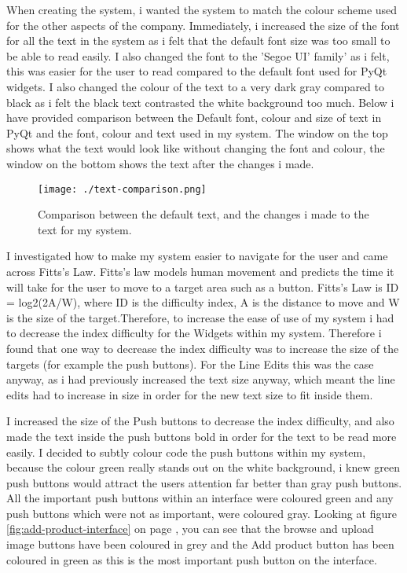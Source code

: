 When creating the system, i wanted the system to match the colour scheme used for the other aspects of the company. Immediately, i increased the size of the font for all the text in the system as i felt that the default font size was too small to be able to read easily. I also changed the font to the 'Segoe UI' family' as i felt, this was easier for the user to read compared to the default font used for PyQt widgets. I also changed the colour of the text to a very dark gray compared to black as i felt the black text contrasted the white background too much. Below i have provided comparison between the Default font, colour and size of text in PyQt and the font, colour and text used in my system. The window on the top shows what the text would look like without changing the font and colour, the window on the bottom shows the text after the changes i made.

\begin{figure}[H]
    \texttt{[image: ./text-comparison.png]}
    \caption{Comparison between the default text, and the changes i made to the text for my system.} \label{fig:text-comparison}
\end{figure}

I investigated how to make my system easier to navigate for the user and came across Fitts's Law. Fitts's law models human movement and predicts the time it will take for the user to move to a target area such as a button. Fitts's Law is ID = log2(2A/W), where ID is the difficulty index, A is the distance to move and W is the size of the target.Therefore, to increase the ease of use of my system i had to decrease the index difficulty for the Widgets within my system. Therefore i found that one way to decrease the index difficulty was to increase the size of the targets (for example the push buttons). For the Line Edits this was the case anyway, as i had previously increased the text size anyway, which meant the line edits had to increase in size in order for the new text size to fit inside them.\par

I increased the size of the Push buttons to decrease the index difficulty, and also made the text inside the push buttons bold in order for the text to be read more easily. I decided to subtly colour code the push buttons within my system, because the colour green really stands out on the white background, i knew green push buttons would attract the users attention far better than gray push buttons. All the important push buttons within an interface were coloured green and any push buttons which were not as important, were coloured gray. Looking at figure \ref{fig:add-product-interface} on page \pageref{fig:add-product-interface}, you can see that the browse and upload image buttons have been coloured in grey and the Add product button has been coloured in green as this is the most important push button on the interface. \par

